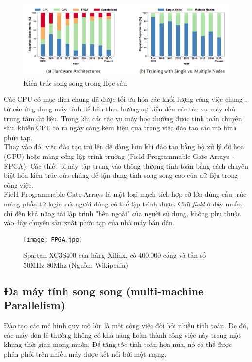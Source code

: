 \documentclass[11pt,a4paper]{article}
\numberwithin{equation}{subsection}
\numberwithin{figure}{subsection}
\numberwithin{table}{subsection}
\begin{document}
\begin{figure}[!h]
\begin{center}
\includegraphics[scale=0.75]{parallel_Deep.PNG}
\end{center}
\caption{Kiến trúc song song trong Học sâu}
\end{figure}

Các CPU có mục đích chung đã được tối ưu hóa các khối lượng công việc chung , từ các ứng dụng máy tính để bàn theo hướng sự kiện đến các tác vụ máy chủ trung tâm dữ liệu. Trong khi các tác vụ máy học thường được tính toán chuyên sâu, khiến CPU tỏ ra ngày càng kém hiệu quả trong việc đào tạo các mô hình phức tạp.\\

Thay vào đó, việc đào tạo trở lên dễ dàng hơn khi đào tạo bằng bộ xử lý đồ họa (GPU) hoặc mảng cổng lập trình trường (Field-Programmable Gate Arrays - FPGA). Các thiết bị này tập trung vào thông thượng tính toán bằng cách chuyên biệt hóa kiến trúc của chúng để tận dụng tính song song cao của dữ liệu trong công việc.\\

Field-Programmable Gate Arrays  là một loại mạch tích hợp cỡ lớn dùng cấu trúc mảng phần tử logic mà người dùng có thể lập trình được. Chữ \textit{field} ở đây muốn chỉ đến khả năng tái lập trình "bên ngoài" của người sử dụng, không phụ thuộc vào dây chuyền sản xuất phức tạp của nhà máy bán dẫn.

\begin{figure}[!h]
\begin{center}
\texttt{[image: FPGA.jpg]}
\end{center}
\caption{Spartan XC3S400 của hãng Xilinx, có 400.000 cổng và tần số 50MHz-80Mhz (Nguồn: Wikipedia)}
\end{figure}

\subsection{Đa máy tính song song (multi-machine Parallelism)}
Đào tạo các mô hình quy mô lớn là một công việc đòi hỏi nhiều tính toán. Do đó, các máy đơn lẻ thường không có khả năng hoàn thành công việc này trong một khung thời gian mong muốn. Để tăng tốc tính toán hơn nữa, nó có thể được phân phối trên nhiều máy được kết nối bởi một mạng.
\end{document}
